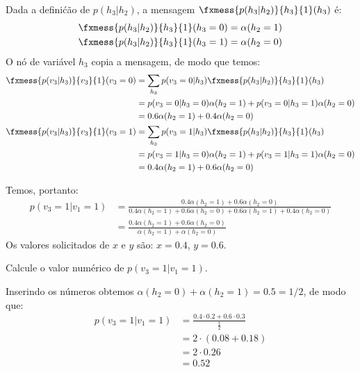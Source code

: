 \begin{exenumerate}
    \begin{solution}
        Dada a defini\'c\~ao de $p(h_3| h_2)$, a mensagem $\fxmess{p(h_3|h_2)}{h_3}{1}(h_3)$ \'e:
        \begin{align}
            \fxmess{p(h_3|h_2)}{h_3}{1}(h_3=0) & = \alpha(h_2 = 1)\\
            \fxmess{p(h_3|h_2)}{h_3}{1}(h_3=1) & = \alpha(h_2 = 0)
        \end{align}
        O n\'o de vari\'avel $h_3$ copia a mensagem, de modo que temos:
        \begin{align}
            \fxmess{p(v_3|h_3)}{v_3}{1}(v_3=0) & = \sum_{h_3} p(v_3=0 | h_3)  \fxmess{p(h_3|h_2)}{h_3}{1}(h_3) \\
            & =  p(v_3=0 | h_3=0)  \alpha(h_2 = 1) + p(v_3=0 | h_3=1)  \alpha(h_2 = 0)\\
            & = 0.6  \alpha(h_2 = 1) + 0.4  \alpha(h_2 = 0)\\
            \fxmess{p(v_3|h_3)}{v_3}{1}(v_3=1) & = \sum_{h_3} p(v_3=1 | h_3)  \fxmess{p(h_3|h_2)}{h_3}{1}(h_3) \\
            & = p(v_3=1 | h_3=0)  \alpha(h_2 = 1) + p(v_3=1 | h_3=1)  \alpha(h_2 = 0)\\
            & = 0.4 \alpha(h_2=1) + 0.6 \alpha(h_2=0)
        \end{align}
        
        Temos, portanto:
        \begin{align}
            p(v_3 = 1| v_1=1) &=  \frac{0.4 \alpha(h_2=1) + 0.6 \alpha(h_2=0)}{ 0.4 \alpha(h_2=1) + 0.6 \alpha(h_2=0) +  0.6  \alpha(h_2 = 1) + 0.4  \alpha(h_2 = 0)}\\
            & =  \frac{0.4 \alpha(h_2=1) + 0.6 \alpha(h_2=0)}{\alpha(h_2=1)+\alpha(h_2=0)}
        \end{align}
        Os valores solicitados de $x$ e $y$ s\~ao: $x = 0.4$, $y = 0.6$. 
    \end{solution}
    
    \item Calcule o valor num\'erico de $p(v_3 =1 | v_1=1)$.
    
    \begin{solution}
        Inserindo os n\'umeros obtemos $\alpha(h_2=0)+\alpha(h_2=1) = 0.5 = 1/2$, de modo que:
        \begin{align}
            p(v_3 = 1| v_1=1) &= \frac{0.4 \cdot 0.2 + 0.6 \cdot 0.3}{\frac{1}{2}}\\
            &= 2 \cdot (0.08 + 0.18)\\
            &= 2 \cdot 0.26\\
            &= 0.52
        \end{align}
    \end{solution}
    
\end{exenumerate}


